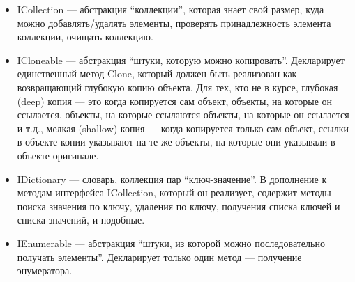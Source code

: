 \documentclass[a5paper]{article}
\begin{document}
\begin{itemize}
    \item ICollection --- абстракция ``коллекции'', которая знает свой размер, куда можно добавлять/удалять элементы, проверять принадлежность элемента коллекции, очищать коллекцию.
    \item ICloneable --- абстракция ``штуки, которую можно копировать''. Декларирует единственный метод Clone, который должен быть реализован как возвращающий глубокую копию объекта. Для тех, кто не в курсе, глубокая (deep) копия --- это когда копируется сам объект, объекты, на которые он ссылается, объекты, на которые ссылаются объекты, на которые он ссылается и т.д., мелкая (shallow) копия --- когда копируется только сам объект, ссылки в объекте-копии указывают на те же объекты, на которые они указывали в объекте-оригинале.
    \item IDictionary --- словарь, коллекция пар ``ключ-значение''. В дополнение к методам интерфейса ICollection, который он реализует, содержит методы поиска значения по ключу, удаления по ключу, получения списка ключей и списка значений, и подобные.
    \item IEnumerable --- абстракция ``штуки, из которой можно последовательно получать элементы''. Декларирует только один метод --- получение энумератора.

\end{itemize}
\end{document}
